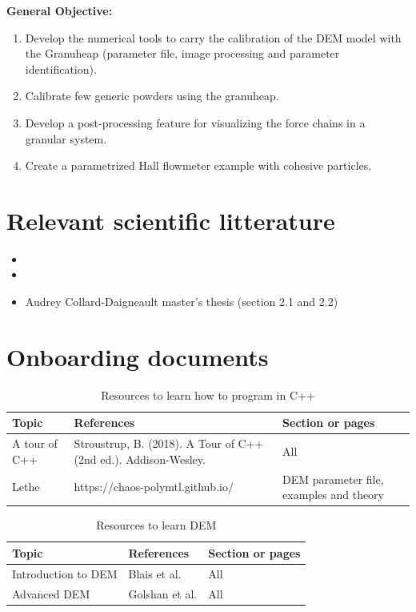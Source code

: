\documentclass[12pt]{article}
\newcounter{theo}[section]\setcounter{theo}{0}
\begin{document}
\textbf{General Objective:} 

\begin{enumerate}
  \item Develop the numerical tools to carry the calibration of the DEM model with the Granuheap  (parameter file, image processing and parameter identification).
  \item Calibrate few generic powders using the granuheap.
  \item Develop a post-processing feature for visualizing the force chains in a granular system. 
  \item Create a parametrized Hall flowmeter example with cohesive particles.
\end{enumerate}


\section{Relevant scientific litterature}
\begin{itemize}
  \item {}
  \item {}
  \item Audrey Collard-Daigneault master's thesis (section 2.1 and 2.2)
\end{itemize}

\newpage
\section{Onboarding documents}

\begin{center}
  \begin{table}[h]
\caption{Resources to learn how to program in C++} 
\centering
\begin{tabular}{p{3cm}|p{8cm}|p{3cm}}
 Topic & References & Section or pages \\
 \hline
 \hline
 A tour of C++ & Stroustrup, B. (2018). A Tour of C++ (2nd ed.). Addison-Wesley. & All \\
 \hline
 Lethe & https://chaos-polymtl.github.io/ & DEM parameter file, examples and theory\\
\end{tabular}
\end{table}
\end{center}


\begin{center}
  \begin{table}[h]
\caption{Resources to learn DEM} 
\centering
\begin{tabular}{p{3cm}|p{8cm}|p{3cm}}
 Topic & References & Section or pages \\
 \hline
 \hline
 Introduction to DEM & Blais et al. \cite{blais2019experimental}&  All \\
 \hline
 Advanced DEM &  Golshan et al. \cite{golshan2023lethe} & All\\
\end{tabular}
\end{table}
\end{center}
\end{document}
